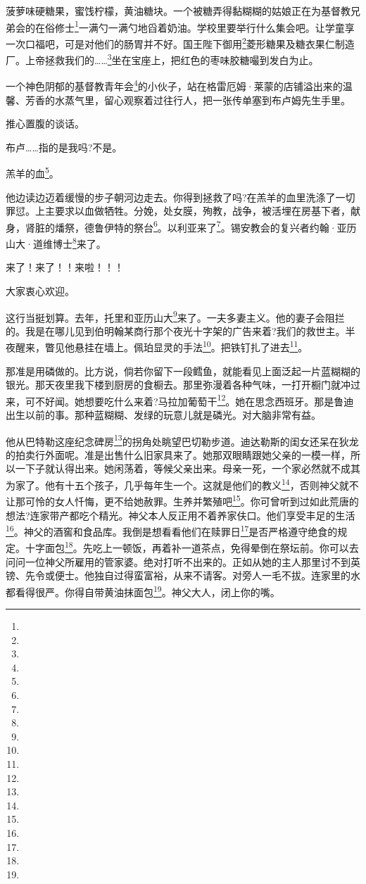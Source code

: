 \par 菠萝味硬糖果，蜜饯柠檬，黄油糖块。一个被糖弄得黏糊糊的姑娘正在为基督教兄弟会的在俗修士\footnote{}一满勺一满勺地舀着奶油。学校里要举行什么集会吧。让学童享一次口福吧，可是对他们的肠胃并不好。国王陛下御用\footnote{}菱形糖果及糖衣果仁制造厂。上帝拯救我们的……\footnote{}坐在宝座上，把红色的枣味胶糖嘬到发白为止。
\par 一个神色阴郁的基督教青年会\footnote{}的小伙子，站在格雷厄姆·莱蒙的店铺溢出来的温馨、芳香的水蒸气里，留心观察着过往行人，把一张传单塞到布卢姆先生手里。
\par 推心置腹的谈话。
\par 布卢……指的是我吗?不是。
\par 羔羊的血\footnote{}。
\par 他边读边迈着缓慢的步子朝河边走去。你得到拯救了吗?在羔羊的血里洗涤了一切罪愆。上主要求以血做牺牲。分娩，处女膜，殉教，战争，被活埋在房基下者，献身，肾脏的燔祭，德鲁伊特的祭台\footnote{}。以利亚来了\footnote{}。锡安教会的复兴者约翰·亚历山大·道维博士\footnote{}来了。
\par 来了！来了！！来啦！！！
\par 大家衷心欢迎。
\par 这行当挺划算。去年，托里和亚历山大\footnote{}来了。一夫多妻主义。他的妻子会阻拦的。我是在哪儿见到伯明翰某商行那个夜光十字架的广告来着?我们的救世主。半夜醒来，瞥见他悬挂在墙上。佩珀显灵的手法\footnote{}。把铁钉扎了进去\footnote{}。
\par 那准是用磷做的。比方说，倘若你留下一段鳕鱼，就能看见上面泛起一片蓝糊糊的银光。那天夜里我下楼到厨房的食橱去。那里弥漫着各种气味，一打开橱门就冲过来，可不好闻。她想要吃什么来着?马拉加葡萄干\footnote{}。她在思念西班牙。那是鲁迪出生以前的事。那种蓝糊糊、发绿的玩意儿就是磷光。对大脑非常有益。
\par 他从巴特勒这座纪念碑房\footnote{}的拐角处眺望巴切勒步道。迪达勒斯的闺女还呆在狄龙的拍卖行外面呢。准是出售什么旧家具来了。她那双眼睛跟她父亲的一模一样，所以一下子就认得出来。她闲荡着，等候父亲出来。母亲一死，一个家必然就不成其为家了。他有十五个孩子，几乎每年生一个。这就是他们的教义\footnote{}，否则神父就不让那可怜的女人忏悔，更不给她赦罪。生养并繁殖吧\footnote{}。你可曾听到过如此荒唐的想法?连家带产都吃个精光。神父本人反正用不着养家伕口。他们享受丰足的生活\footnote{}。神父的酒窖和食品库。我倒是想看看他们在赎罪日\footnote{}是否严格遵守绝食的规定。十字面包\footnote{}。先吃上一顿饭，再着补一道茶点，免得晕倒在祭坛前。你可以去问问一位神父所雇用的管家婆。绝对打听不出来的。正如从她的主人那里讨不到英镑、先令或便士。他独自过得蛮富裕，从来不请客。对旁人一毛不拔。连家里的水都看得很严。你得自带黄油抹面包\footnote{}。神父大人，闭上你的嘴。
